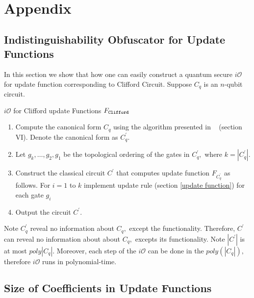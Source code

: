 \section{Appendix} 
 \subsection{Indistinguishability Obfuscator for Update Functions}
 \label{sec: iO-clifford-functions}
 In this section we show that how one can easily construct a quantum secure $i\mathcal{O}$ for update function corresponding to Clifford Circuit. Suppose $C_q$ is an $n$-qubit circuit.
\begin{algorithm}[H]
  \caption{$i\mathcal{O}$ for Clifford update Functions $F_{\tt Clifford}$}
  \begin{enumerate}
  \item Compute the canonical form $C_q$ using the algorithm presented in ~\cite{AG04} (section VI). Denote the canonical form as $C_q^\prime.$
  \item Let $g_k, \ldots,g_2,g_1$ be the topological ordering of the gates in $C_q^\prime,$ where $k=|C_q^\prime|.$
  \item Construct the classical circuit $C^\prime$ that computes update function $F_{C_q^\prime}$ as follows. For $i=1$ to $k$ implement update rule (section \ref{update function})  for each gate $g_i$
  \item Output the circuit $C^\prime.$
  \end{enumerate}
\end{algorithm}
%
\noindent Note $C_q^\prime$ reveal no information about $C_q,$ except the functionality. Therefore, $C^\prime$ can reveal no information about about $C_q,$ excepts its functionality. Note $|C^\prime|$ is at most $poly|C_q|.$ Moreover, each step of the $i\mathcal{O}$ can be done in the $poly(|C_q|),$ therefore $i\mathcal{O}$ runs in polynomial-time.



 \subsection{Size of Coefficients in Update Functions}
 \label{coeff:size}
